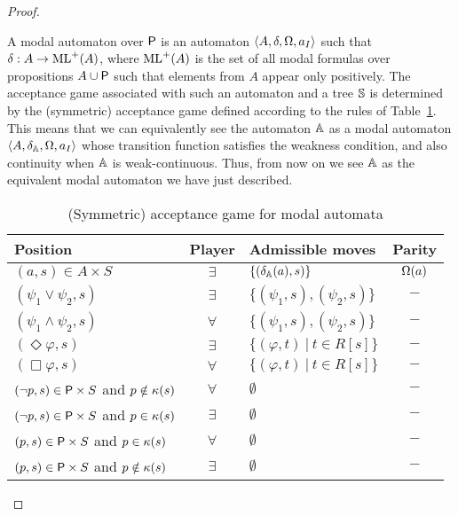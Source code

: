 \begin{proof}
\begin{pfclaim}
A modal automaton over $\mathsf{P}$ is an automaton $ \langle{A, \delta, \Omega, a_I}\rangle$ such that $\delta : A \to \mathrm{ML}^+ (A)$, where $\mathrm{ML}^+ (A)$ is the set of all modal formulas over propositions $A \cup \mathsf{P}$ such that elements from $A$ appear only positively.
The acceptance game associated with such an automaton and a tree $\mathbb{S}$ is determined by the (symmetric) acceptance game defined according to the rules of Table~\ref{symmetric_modal_game}.
This means that we can equivalently see the automaton $\mathbb{A}$ as a modal automaton $\langle{A, \delta_\ensuremath\mathbb{A}, \Omega, a_I}\rangle$ whose transition function satisfies the weakness condition, and also continuity when $\mathbb{A}$ is weak-continuous. Thus, from now on we see $\mathbb{A}$ as the equivalent modal automaton we have just described.%

\begin{table}[h]
  \centering
\begin{tabular}{|l|c|l|c|}
 \hline
  Position & Player & Admissible moves & Parity\\
   \hline
  $(a,s) \in A \times S$ & $\exists$ & $\{(\delta_\mathbb{A}(a),s)\}$ & $\Omega(a)$\\
  $(\psi_1 \vee \psi_2,s)$ & $\exists$ & $\{(\psi_1,s),(\psi_2,s) \}$ & $-$ \\
  $(\psi_1 \wedge \psi_2,s)$ & $\forall$ & $\{(\psi_1,s),(\psi_2,s) \}$ & $-$ \\
  $(\Diamond\varphi,s)$ & $\exists$ & $\{(\varphi,t)\ |\ t \in R[s] \}$ & $-$ \\
  $(\Box\varphi,s)$ & $\forall$ & $\{(\varphi,t)\ |\ t \in R[s] \}$ & $-$ \\
  $(\lnot p,s) \in \mathsf{P} \times S$ and $p \notin \kappa(s)$ & $\forall$ & $\emptyset$ & $-$\\
  $(\lnot p,s) \in \mathsf{P} \times S$ and $p \in \kappa(s)$ & $\exists$ & $\emptyset$ & $-$\\
  $(p,s) \in \mathsf{P} \times S$ and $p \in \kappa(s)$ & $\forall$ & $\emptyset$ & $-$\\
  $(p,s) \in \mathsf{P} \times S$ and $p \notin \kappa(s)$ & $\exists$ & $\emptyset$ & $-$\\

  \hline
\end{tabular}
 \caption{(Symmetric) acceptance game for modal automata}
 \label{symmetric_modal_game}
\end{table}






\end{pfclaim}
\end{proof}
